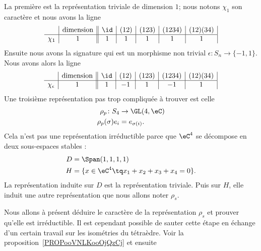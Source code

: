 La première est la représentation triviale de dimension \( 1\); nous notons \( \chi_1\) son caractère et nous avons la ligne
\begin{equation}
	\begin{array}[]{c|c||c|c|c|c|c|}
		       & \text{dimension} & \id & (12) & (123) & (1234) & (12)(34) \\
		\hline
		\chi_1 & 1                & 1   & 1    & 1     & 1      & 1        \\
	\end{array}
\end{equation}
Ensuite nous avons la signature qui est un morphisme non trivial \( \epsilon\colon S_n\to \{ -1,1 \}\). Nous avons alors la ligne
\begin{equation}    \label{EqGNRavtl}
	\begin{array}[]{c|c||c|c|c|c|c|}
		                & \text{dimension} & \id & (12) & (123) & (1234) & (12)(34) \\
		\hline
		\chi_{\epsilon} & 1                & 1   & -1   & 1     & -1     & 1        \\
	\end{array}
\end{equation}
Une troisième représentation pas trop compliquée à trouver est celle
\begin{equation}
	\begin{aligned}
		\rho_p\colon S_4  & \to \GL(4,\eC)  \\
		\rho_p(\sigma)e_i & =e_{\sigma(i)}.
	\end{aligned}
\end{equation}
Cela n'est pas une représentation irréductible parce que \( \eC^4\) se décompose en deux sous-espaces stables :
\begin{subequations}
	\begin{align}
		D & =\Span(1,1,1,1)                        \\
		H & =\{ x\in\eC^4\tq x_1+x_2+x_3+x_4=0 \}.
	\end{align}
\end{subequations}
La représentation induite sur \( D\) est la représentation triviale. Puis sur \( H\), elle induit une autre représentation que nous allons noter \( \rho_s\).

Nous allons à présent déduire le caractère de la représentation \( \rho_s\) et prouver qu'elle est irréductible. Il est cependant possible de sauter cette étape en échange d'un certain travail sur les isométries du tétraèdre. Voir la proposition~\ref{PROPooVNLKooOjQzCj} et ensuite

